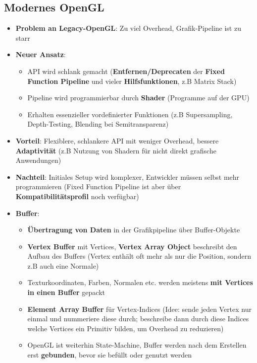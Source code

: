 \documentclass[10pt,a4paper]{article}
\begin{document}
	\subsection{Modernes OpenGL}
	\label{gl:sub:modernes_opengl}
	
	\begin{itemize}
		\item \textbf{Problem an Legacy-OpenGL}: Zu viel Overhead, Grafik-Pipeline ist zu starr
		\item \textbf{Neuer Ansatz}:
		\begin{itemize}
			\item API wird schlank gemacht (\textbf{Entfernen/Deprecaten} der \textbf{Fixed Function Pipeline} und vieler \textbf{Hilfsfunktionen}, z.B Matrix Stack)
			\item Pipeline wird programmierbar durch \textbf{Shader} (Programme auf der GPU)
			\item Erhalten essenzieller vordefinierter Funktionen (z.B Supersampling, Depth-Testing, Blending bei Semitransparenz)
		\end{itemize}
		\item \textbf{Vorteil}: Flexiblere, schlankere API mit weniger Overhead, bessere \textbf{Adaptivität} (z.B Nutzung von Shadern für nicht direkt grafische Anwendungen)
		\item \textbf{Nachteil}: Initiales Setup wird komplexer, Entwickler müssen selbst mehr programmieren (Fixed Function Pipeline ist aber über \textbf{Kompatibilitätsprofil} noch verfügbar)
		\item \textbf{Buffer}:
		\begin{itemize}
			\item \textbf{Übertragung von Daten} in der Grafikpipeline über Buffer-Objekte
			\item \textbf{Vertex Buffer} mit Vertices, \textbf{Vertex Array Object} beschreibt den Aufbau des Buffers (Vertex enthält oft mehr als nur die Position, sondern z.B auch eine Normale)
			\item Texturkoordinaten, Farben, Normalen etc. werden meistens \textbf{mit Vertices in einen Buffer} gepackt
			\item \textbf{Element Array Buffer} für Vertex-Indices (Idee: sende jeden Vertex nur einmal und nummeriere diese durch; beschreibe dann durch diese Indices welche Vertices ein Primitiv bilden, um Overhead zu reduzieren)
			\item OpenGL ist weiterhin State-Machine, Buffer werden nach dem Erstellen erst \textbf{gebunden}, bevor sie befüllt oder genutzt werden

\end{itemize}
\end{itemize}
\end{document}
